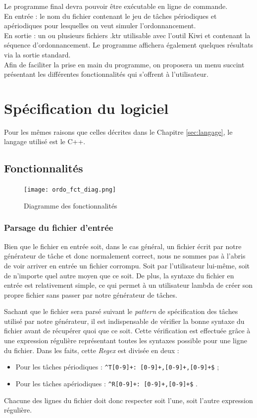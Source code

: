 	Le programme final devra pouvoir être exécutable en ligne de commande.\\
		
	En entrée : le nom du fichier contenant le jeu de tâches périodiques et apériodiques pour lesquelles on veut simuler l'ordonnancement.\\
		
	En sortie : un ou plusieurs fichiers .ktr utilisable avec l'outil Kiwi et contenant la séquence d'ordonnancement. Le programme affichera également quelques résultats via la sortie standard.\\
		
		Afin de faciliter la prise en main du programme, on proposera un menu succint présentant les différentes fonctionnalités qui s'offrent à l'utilisateur.
	
	\section{Spécification du logiciel}
		Pour les mêmes raisons que celles décrites dans le Chapitre \ref{sec:langage}, le langage utilisé est le C++.

		\subsection{Fonctionnalités}
			\begin{figure}[!h]
				\centering
				\texttt{[image: ordo\_fct\_diag.png]}
				\caption{Diagramme des fonctionnalités}
			\end{figure}
			\FloatBarrier
			
			\subsubsection{Parsage du fichier d'entrée}
				Bien que le fichier en entrée soit, dans le cas général, un fichier écrit par notre générateur de tâche et donc normalement correct, nous ne sommes pas à l'abris de voir arriver en entrée un fichier corrompu. Soit par l'utilisateur lui-même, soit de n'importe quel autre moyen que ce soit. De plus, la syntaxe du fichier en entrée est relativement simple, ce qui permet à un utilisateur lambda de créer son propre fichier sans passer par notre générateur de tâches.
				
				Sachant que le fichier sera parsé suivant le \emph{pattern} de spécification des tâches utilisé par notre générateur, il est indispensable de vérifier la bonne syntaxe du fichier avant de récupérer quoi que ce soit. Cette vérification est effectuée grâce à une expression régulière représentant toutes les syntaxes possible pour une ligne du fichier. Dans les faits, cette \emph{Regex} est divisée en deux :
				\begin{itemize}
					\item Pour les tâches périodiques : \verb|^T[0-9]+: [0-9]+,[0-9]+,[0-9]+$| ;
					\item Pour les tâches apériodiques : \verb|^R[0-9]+: [0-9]+,[0-9]+$| .
				\end{itemize}
				Chacune des lignes du fichier doit donc respecter soit l'une, soit l'autre expression régulière.\\
				
